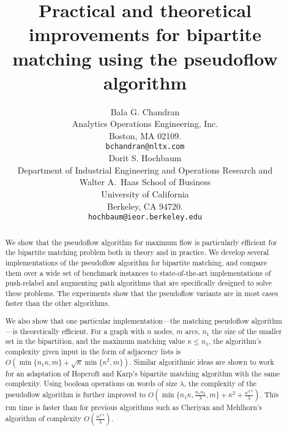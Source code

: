\documentclass{article}
\begin{document}
\title{Practical and theoretical improvements for bipartite matching using the pseudoflow algorithm}
\author{Bala G. Chandran\\
\small Analytics Operations Engineering, Inc.\\
\small Boston, MA 02109. \\
\small {\tt bchandran@nltx.com}\medskip  \\
Dorit S. Hochbaum\\
\small Department of Industrial Engineering and Operations Research and\\
\small Walter A.\ Haas School of Business \\
\small University of California \\
\small Berkeley, CA 94720.\\
\small {\tt hochbaum@ieor.berkeley.edu}}

\date{}
\renewcommand{\baselinestretch}{1}

\maketitle

\renewcommand{\baselinestretch}{1.2}

\begin{abstract}
We show that the pseudoflow algorithm for maximum flow is particularly efficient for the bipartite matching problem both in theory and in practice. We develop several implementations of the pseudoflow algorithm for bipartite matching, and compare them over a wide set of benchmark instances to state-of-the-art implementations of push-relabel and augmenting path algorithms that are specifically designed to solve these problems.  The experiments show that the pseudoflow variants are in most cases faster than the other algorithms.

We also show that one particular implementation---the matching pseudoflow algorithm---is theoretically efficient.  For a graph with $n$ nodes, $m$ arcs, $n_1$ the size of the smaller set in the bipartition, and the maximum matching value $\kappa \leq n_1$, the algorithm's complexity given input in the form of adjacency lists is \mbox{$O\left (\min \{ n_1\kappa,m\} + \sqrt{\kappa}\min \{\kappa^2,m\}\right )$}.  Similar algorithmic ideas are shown to work for an adaptation of Hopcroft and Karp's bipartite matching algorithm with the same complexity.  Using boolean operations on words of size $\lambda$, the complexity of the pseudoflow algorithm is further improved to $O\left (\min \{n_1\kappa, \frac{n_1n_2}{\lambda}, m\} + \kappa^2 + \frac{\kappa^{2.5}}{\lambda}\right )$.  This run time is faster than for previous algorithms such as Cheriyan and Mehlhorn's algorithm of complexity $O\left(\frac{n^{2.5}}{\lambda}\right)$.
\end{abstract}
\end{document}
